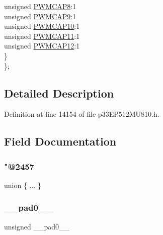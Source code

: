 \begin{DoxyCompactItemize}
\begin{tabbing}
\>\>unsigned \hyperlink{structtag_p_w_m_c_a_p1_b_i_t_s_a01b802d233dbea59cd23996d219e39c9}{PWMCAP8}:1\\
\>\>unsigned \hyperlink{structtag_p_w_m_c_a_p1_b_i_t_s_a9a0cd5d7a58681927adecfd9946b75fb}{PWMCAP9}:1\\
\>\>unsigned \hyperlink{structtag_p_w_m_c_a_p1_b_i_t_s_a765ff5b5b1008d8aeb0359590759bd42}{PWMCAP10}:1\\
\>\>unsigned \hyperlink{structtag_p_w_m_c_a_p1_b_i_t_s_a50c60306a98023b9bb8fac50c8d5e965}{PWMCAP11}:1\\
\>\>unsigned \hyperlink{structtag_p_w_m_c_a_p1_b_i_t_s_a8fec92523cf22c89f156a97aca44dcff}{PWMCAP12}:1\\
\>\} \\
\}; \\

\end{tabbing}\end{DoxyCompactItemize}


\subsection{Detailed Description}


Definition at line 14154 of file p33\+E\+P512\+M\+U810.\+h.



\subsection{Field Documentation}
\mbox{\label{structtag_p_w_m_c_a_p1_b_i_t_s_a5a117c3df57620b4dc293d2f51cca5bd}} 
\subsubsection{\texorpdfstring{"@2457}{@2457}}
{\footnotesize\ttfamily union \{ ... \} }

\mbox{\label{structtag_p_w_m_c_a_p1_b_i_t_s_adf71f3d8410c1f1dbbc96680a92c49af}} 
\subsubsection{\texorpdfstring{\+\_\+\+\_\+pad0\+\_\+\+\_\+}{\_\_pad0\_\_}}
{\footnotesize\ttfamily unsigned \+\_\+\+\_\+pad0\+\_\+\+\_\+}



